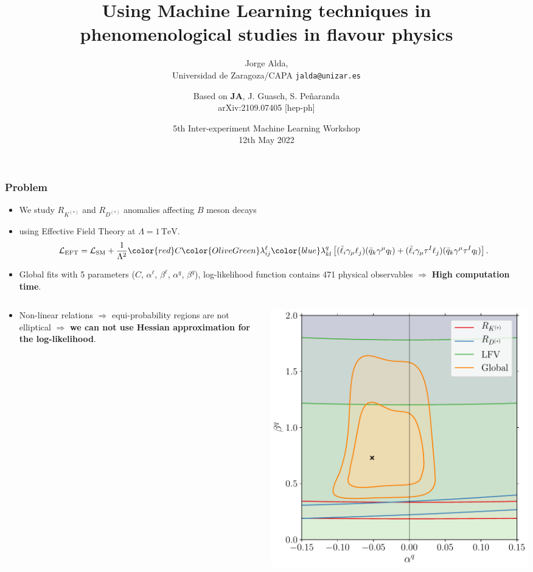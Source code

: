 \documentclass[mathserif, 10pt, dvipsnames]{beamer}
\title[Using ML techniques in phenomenological studies in flavour physics]{Using Machine Learning techniques in\\ phenomenological studies in flavour physics}
\subtitle{Jorge Alda,\\ Universidad de Zaragoza/CAPA \hspace{4em} \texttt{jalda@unizar.es} }
\author[Jorge Alda]{Based on \textbf{JA}, J. Guasch, S. Peñaranda \\
arXiv:2109.07405 [hep-ph]}
\date[CERN Workshop]{\footnotesize 5th Inter-experiment Machine Learning Workshop \\\footnotesize 12th May 2022}
\begin{document}
\begin{frame}

\titlepage

\end{frame}

\begin{frame}\frametitle{Problem}
\begin{itemize}
\item We study $R_{K^{(*)}}$ and $R_{D^{(*)}}$ anomalies affecting $B$ meson decays
    \item using Effective Field Theory at $\Lambda = 1\,\mathrm{TeV}$.
$$\mathcal{L}_\mathrm{EFT} = \mathcal{L}_\mathrm{SM} + \frac{1}{\Lambda^2} {\color{red}C} {\color{OliveGreen}\lambda^\ell_{ij}} {\color{blue}\lambda^q_{kl}}\left[ (\bar{\ell}_i \gamma_\mu \ell_j)(\bar{q}_k \gamma^\mu  q_l) + (\bar{\ell}_i \gamma_\mu \tau^I \ell_j)(\bar{q}_k \gamma^\mu \tau^I q_l) \right].$$
\item Global fits with 5 parameters ({\color{red}$C$}, {\color{OliveGreen}$\alpha^\ell$}, {\color{OliveGreen}$\beta^\ell$}, {\color{blue}$\alpha^q$}, {\color{blue}$\beta^q$}), log-likelihood function contains 471 physical observables $\Longrightarrow$ \textbf{High computation time}.
\end{itemize}
\begin{columns}[onlytextwidth]
    \begin{column}{0.7\textwidth}
        \begin{itemize}
\item Non-linear relations $\Longrightarrow$ equi-probability regions are not elliptical $\Longrightarrow$ \textbf{we can not use Hessian approximation for the log-likelihood}.
        \end{itemize}
    \end{column}
    \begin{column}{0.25\textwidth}
        \includegraphics[width=\textwidth]{figures/alphabeta_q.pdf}

\end{column}
\end{columns}
\end{frame}
\end{document}

